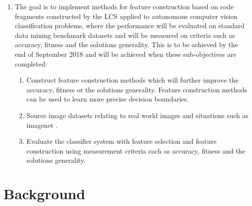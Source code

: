 \begin{enumerate}
\begin{enumerate}
		\item Construct embedded, filter or wrapper feature selection methods. These feature selection methods are defined as methods which embed the selection within the basic induction algorithm, methods which use feature selection to filter features passed to induction, and methods that treat feature selection as a wrapper around the induction process \cite{blum1997selection}.
		
		\item Evaluate these methods against the raw feature benchmarks. Evaluation will be measured on accuracy, fitness and the solution\textquotesingle s generality. 
		
	\end{enumerate}
	
	\item The goal is to implement methods for feature construction based on code fragments constructed by the LCS applied to autonomous computer vision classification problems, where the performance will be evaluated on standard data mining benchmark datasets and will be measured on criteria such as accuracy, fitness and the solution\textquotesingle s generality. This is to be achieved by the end of September 2018 and will be achieved when these sub-objectives are completed:
	\begin{enumerate}
		\item Construct feature construction methods which will further improve the accuracy, fitness or the solution\textquotesingle s generality. Feature construction methods can be used to learn more precise decision boundaries.
		
		\item Source image datasets relating to real world images and situations such as imagenet \cite{imagenet}.
	
		\item Evaluate the classifier system with feature selection and feature construction using measurement criteria such as accuracy, fitness and the solution\textquotesingle s generality.
		
	\end{enumerate}
	
\end{enumerate}
\chapter{Background}

